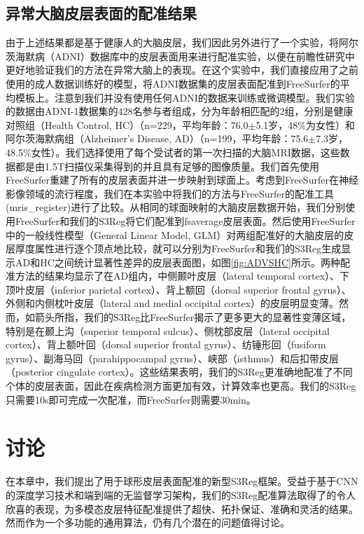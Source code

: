 \subsection{异常大脑皮层表面的配准结果}
由于上述结果都是基于健康人的大脑皮层，我们因此另外进行了一个实验，将阿尔茨海默病（ADNI）数据库\cite{jack2008alzheimer}中的皮层表面用来进行配准实验，以便在前瞻性研究中更好地验证我们的方法在异常大脑上的表现。在这个实验中，我们直接应用了之前使用的成人数据训练好的模型，将ADNI数据集的皮层表面配准到FreeSurfer的平均模板上。注意到我们并没有使用任何ADNI的数据来训练或微调模型。我们实验的数据由ADNI-1数据集的428名参与者组成，分为年龄相匹配的2组，分别是健康对照组（Health Control, HC）（n=229，平均年龄：76.0$\pm$5.1岁，48\%为女性）和阿尔茨海默病组（Alzheimer's Disease, AD）（n=199，平均年龄：75.6$\pm$7.3岁，48.5\%女性）。我们选择使用了每个受试者的第一次扫描的大脑MRI数据，这些数据都是由1.5T扫描仪采集得到的并且具有足够的图像质量。我们首先使用FreeSurfer重建了所有的皮层表面\cite{fischl2012freesurfer}并进一步映射到球面上。考虑到FreeSurfer在神经影像领域的流行程度，我们在本实验中将我们的方法与FreeSurfer的配准工具(mris\_register)进行了比较。从相同的球面映射的大脑皮层数据开始，我们分别使用FreeSurfer和我们的S3Reg将它们配准到fsaverage皮层表面\cite{fischl2012freesurfer}。然后使用FreeSurfer中的一般线性模型（General Linear Model, GLM）对两组配准好的大脑皮层的皮层厚度属性进行逐个顶点地比较，就可以分别为FreeSurfer和我们的S3Reg生成显示AD和HC之间统计显著性差异的皮层表面图，如图\ref{fig:ADVSHC}所示。两种配准方法的结果均显示了在AD组内，中侧颞叶皮层（lateral temporal cortex）、下顶叶皮层（inferior parietal cortex）、背上额回（dorsal superior frontal gyrus）、外侧和内侧枕叶皮层（lateral and medial occipital cortex）的皮层明显变薄。然而，如箭头所指，我们的S3Reg比FreeSurfer揭示了更多更大的显著性变薄区域，特别是在颞上沟（superior temporal sulcus）、侧枕部皮层（lateral occipital cortex）、背上额叶回（dorsal superior frontal gyrus）、纺锤形回（fusiform gyrus）、副海马回（parahippocampal gyrus）、峡部（isthmus）和后扣带皮层（posterior cingulate cortex）。这些结果表明，我们的S3Reg更准确地配准了不同个体的皮层表面，因此在疾病检测方面更加有效，计算效率也更高。我们的S3Reg只需要10s即可完成一次配准，而FreeSurfer则需要30min。

\section{讨论}
在本章中，我们提出了用于球形皮层表面配准的新型S3Reg框架。受益于基于CNN的深度学习技术和端到端的无监督学习架构，我们的S3Reg配准算法取得了的令人欣喜的表现，为多模态皮层特征配准提供了超快、拓扑保证、准确和灵活的结果。然而作为一个多功能的通用算法，仍有几个潜在的问题值得讨论。

